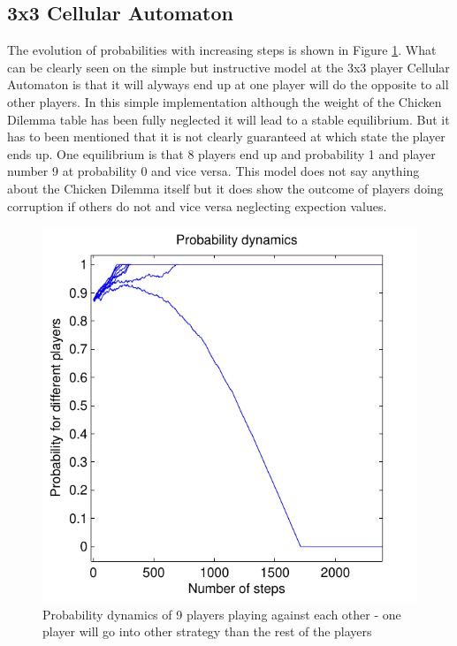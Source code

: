 \documentclass[11pt]{article}
\begin{document}
\subsection{3x3 Cellular Automaton}

The evolution of probabilities with increasing steps is shown in Figure \ref{cell1}. What can be clearly seen on the simple but instructive model at the 3x3 player Cellular Automaton is that it will alyways end up at one player will do the opposite to all other players. In this simple implementation although the weight of the Chicken Dilemma table has been fully neglected it will lead to a stable equilibrium. But it has to been mentioned that it is not clearly guaranteed at which state the player ends up. One equilibrium is that 8 players end up and probability 1 and player number 9 at probability 0 and vice versa. 
This model does not say anything about the Chicken Dilemma itself but it does show the outcome of players doing corruption if others do not and vice versa neglecting expection values.

\begin{figure}[h]
\centering
\includegraphics[scale=1]{ProbabilityDynamics1.pdf}
\caption{Probability dynamics of 9 players playing against each other - one player will go into other strategy than the rest of the players}
\label{cell1}
\end{figure}
\end{document}
